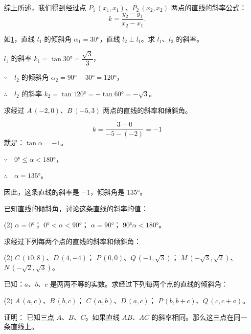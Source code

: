 综上所述，我们得到经过点 $P_1\,(x_1,x_1)$、$P_2\,(x_2,x_2)$ 两点的直线的斜率公式：
\[ k=\frac{y_2-y_1}{x_2-x_1}. \]
\begin{example}
如\cref{fig:1-17}，直线 $l_1$ 的倾斜角 $\alpha_1=\ang{30}$，直线 $l_2 \perp l_1$。求 $l_1$、$l_2$ 的斜率。
\end{example}
\begin{solution}
  $l_1$ 的斜率 $k_1=\tan\ang{30}=\dfrac{\sqrt{3}}{3}$，
  
  $\because\quad l_2$ 的倾斜角 $\alpha_2=\ang{90}+\ang{30}=\ang{120}$，

  $\therefore\quad l_2$ 的斜率 $k_2=\tan\ang{120}=-\tan\ang{60}=-\sqrt{3}$。
\end{solution}
\begin{figure}
  \caption{}\label{fig:1-17}
\end{figure}
\begin{example}
求经过 $A\,(-2,0)$、$B\,(-5,3)$ 两点的直线的斜率和倾斜角。
\end{example}
\begin{solution}
\[ k=\frac{3-0}{-5-(-2)}=-1\]
就是：$\tan \alpha=-1$。

$\because\quad \ang{0}\leqslant\alpha<\ang{180}$，

$\therefore\quad \alpha=\ang{135}$。

因此，这条直线的斜率是 $-1$，倾斜角是 \ang{135}。
\end{solution}

\begin{Practice}
  \begin{question}
    \item 已知直线的倾斜角，讨论这条直线的斜率的值：
    \begin{tasks}(2)
      \task $\alpha=\ang{0}$；
      \task $\ang{0}<\alpha<\ang{90}$；
      \task $\alpha=\ang{90}$；
      \task $\ang{90}\alpha<\ang{180}$。
    \end{tasks}
    \item 求经过下列每两个点的直线的斜率和倾斜角：
    \begin{tasks}(2)
      \task $C\,(10,8)$、$D\,(4,-4)$；
      \task $P\,(0,0)$、$Q\,(-1,\sqrt{3})$；
      \task $M\,(-\sqrt{3},\sqrt{2})$、$N\,(-\sqrt{2},\sqrt{3})$。
    \end{tasks}
    \item 已知：$a$、$b$、$c$ 是两两不等的实数。求经过下列每两个点的直线的倾斜角：
    \begin{tasks}(2)
      \task $A\,(a,c)$、$B\,(b,c)$；
      \task $C\,(a,b)$、$D\,(a,c)$；
      \task $P\,(b,b+c)$、$Q\,(c,c+a)$。
    \end{tasks}
    \item 证明： 已知三点 $A$、$B$、$C$。如果直线 $AB$、$AC$ 的斜率相同。那么这三点在同一条直线上。
  \end{question}
\end{Practice}

